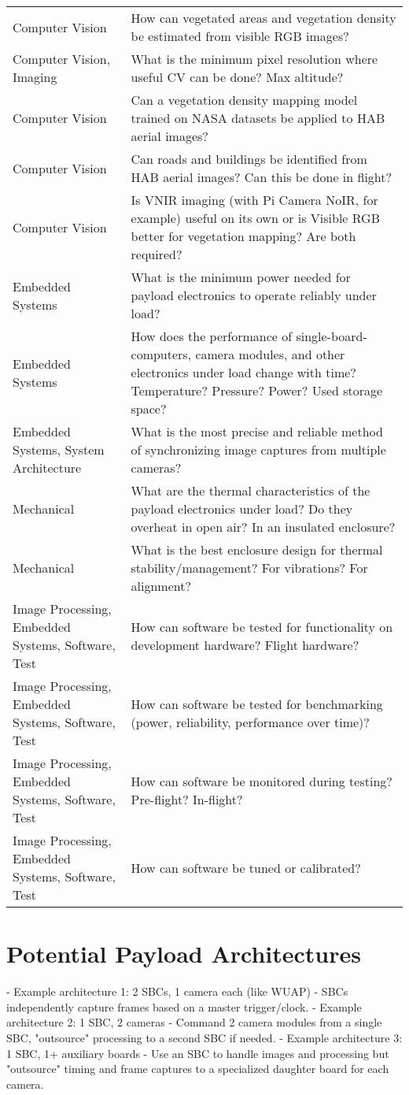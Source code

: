 \documentclass[conference]{IEEEtran} %
\begin{document}
\begin{table}
\begin{tabularx}{\linewidth}{@{}p{}X@{}}
    Computer Vision & How can vegetated areas and vegetation density be estimated from visible RGB images? \\
    Computer Vision, Imaging & What is the minimum pixel resolution where useful CV can be done? Max altitude? \\
    Computer Vision & Can a vegetation density mapping model trained on NASA datasets be applied to HAB aerial images? \\
    Computer Vision & Can roads and buildings be identified from HAB aerial images? Can this be done in flight? \\
    Computer Vision & Is VNIR imaging (with Pi Camera NoIR, for example) useful on its own or is Visible RGB better for vegetation mapping? Are both required? \\
    Embedded Systems & What is the minimum power needed for payload electronics to operate reliably under load? \\
    Embedded Systems & How does the performance of single-board-computers, camera modules, and other electronics under load change with time? Temperature? Pressure? Power? Used storage space? \\
    Embedded Systems, System Architecture & What is the most precise and reliable method of synchronizing image captures from multiple cameras? \\
    Mechanical & What are the thermal characteristics of the payload electronics under load? Do they overheat in open air? In an insulated enclosure? \\
    Mechanical & What is the best enclosure design for thermal stability/management? For vibrations? For alignment? \\
    Image Processing, Embedded Systems, Software, Test & How can software be tested for functionality on development hardware? Flight hardware? \\
    Image Processing, Embedded Systems, Software, Test & How can software be tested for benchmarking (power, reliability, performance over time)? \\
    Image Processing, Embedded Systems, Software, Test & How can software be monitored during testing? Pre-flight? In-flight? \\
    Image Processing, Embedded Systems, Software, Test & How can software be tuned or calibrated? \\
\end{tabularx}
\end{table}

\section{Potential Payload Architectures}
    - Example architecture 1: 2 SBCs, 1 camera each (like WUAP) - SBCs independently capture frames based on a master trigger/clock.
    - Example architecture 2: 1 SBC, 2 cameras - Command 2 camera modules from a single SBC, "outsource" processing to a second SBC if needed.
    - Example architecture 3: 1 SBC, 1+ auxiliary boards - Use an SBC to handle images and processing but "outsource" timing and frame captures to a specialized daughter board for each camera.
\end{document}

